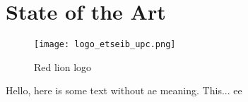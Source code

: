 \documentclass[../main.tex]{subfiles}
\begin{document}
\section{State of the Art}

\begin{figure}[bh]
\centering
\texttt{[image: logo\_etseib\_upc.png]}

\label{fig:img1}
\caption{Red lion logo}
\end{figure}

Hello, here is some text without ae meaning.  This... ee
\end{document}
